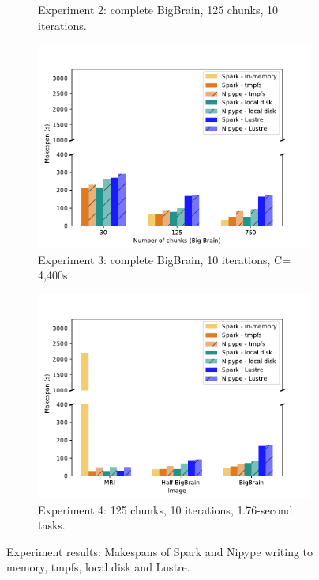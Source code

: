 \begin{figure}
\begin{subfigure}{0.5\columnwidth}
    \caption{Experiment 2: complete BigBrain, 125 chunks, 10 iterations.}\label{fig:cputime}
\end{subfigure}
\begin{subfigure}{0.5\columnwidth}
    \centering
    \captionsetup{width=.85\linewidth}
    \includegraphics[width=\linewidth]{figures/part2-chp1/numchunks.pdf}
    \caption{Experiment 3: complete BigBrain, 10 iterations, C= 4,400s.}\label{fig:numchunks}
\end{subfigure}
\begin{subfigure}{0.5\columnwidth}
    \centering
    \captionsetup{width=.85\linewidth}
    \includegraphics[width=\linewidth]{figures/part2-chp1/datasize.pdf}
    \caption{Experiment 4: 125 chunks, 10 iterations, 1.76-second tasks.}\label{fig:datasize}
\end{subfigure}
\setlength{\belowcaptionskip}{-10pt}
\caption{Experiment results: Makespans of Spark and Nipype writing to memory, tmpfs, local disk and Lustre.}
\label{fig:results}
\end{figure}
